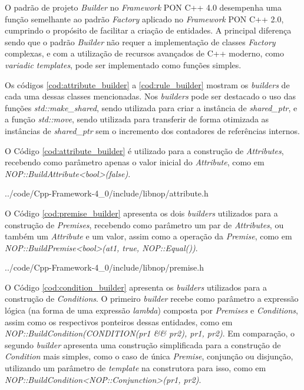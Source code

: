 O padrão de projeto \textit{Builder} no \textit{Framework} PON C++ 4.0
desempenha uma função semelhante ao padrão \textit{Factory} aplicado no
\textit{Framework} PON C++ 2.0, cumprindo o propósito de facilitar a criação de
entidades. A principal diferença sendo que o padrão \textit{Builder} não requer
a implementação de classes \textit{Factory} complexas, e com a utilização de
recursos avançados de C++ moderno, como \textit{variadic templates}, pode ser
implementado como funções simples.

Os códigos \ref{cod:attribute_builder} a \ref{cod:rule_builder} mostram os
\textit{builders} de cada uma dessas classes mencionadas. Nos \textit{builders}
pode ser destacado o uso das funções \textit{std::make\_shared}, sendo utilizada
para criar a instância de \textit{shared\_ptr}, e a função \textit{std::move},
sendo utilizada para transferir de forma otimizada as instâncias de
\textit{shared\_ptr} sem o incremento dos contadores de referências internos.

O Código \ref{cod:attribute_builder} é utilizado para a construção de
\textit{Attributes}, recebendo como parâmetro apenas o valor inicial do
\textit{Attribute}, como em \textit{NOP::BuildAttribute<bool>(false)}.


            {../code/Cpp-Framework-4_0/include/libnop/attribute.h}

O Código \ref{cod:premise_builder} apresenta os dois \textit{builders}
utilizados para a construção de \textit{Premises}, recebendo como parâmetro um
par de \textit{Attributes}, ou também um \textit{Attribute} e um valor, assim
como a operação da \textit{Premise}, como em
\textit{NOP::BuildPremise<bool>(at1, true, NOP::Equal())}.


            {../code/Cpp-Framework-4_0/include/libnop/premise.h}

O Código \ref{cod:condition_builder} apresenta os \textit{builders} utilizados
para a construção de \textit{Conditions}. O primeiro \textit{builder} recebe
como parâmetro a expressão lógica (na forma de uma expressão \textit{lambda})
composta por \textit{Premises} e \textit{Conditions}, assim como os respectivos
ponteiros dessas entidades, como em \textit{NOP::BuildCondition(CONDITION(\*pr1
\&\& \*pr2), pr1, pr2)}. Em comparação, o segundo \textit{builder} apresenta uma
construção simplificada para a construção de \textit{Condition} mais simples,
como o caso de única \textit{Premise}, conjunção ou disjunção, utilizando um
parâmetro de \textit{template} na construtora para isso, como em
\textit{NOP::BuildCondition<NOP::Conjunction>(pr1, pr2)}.

